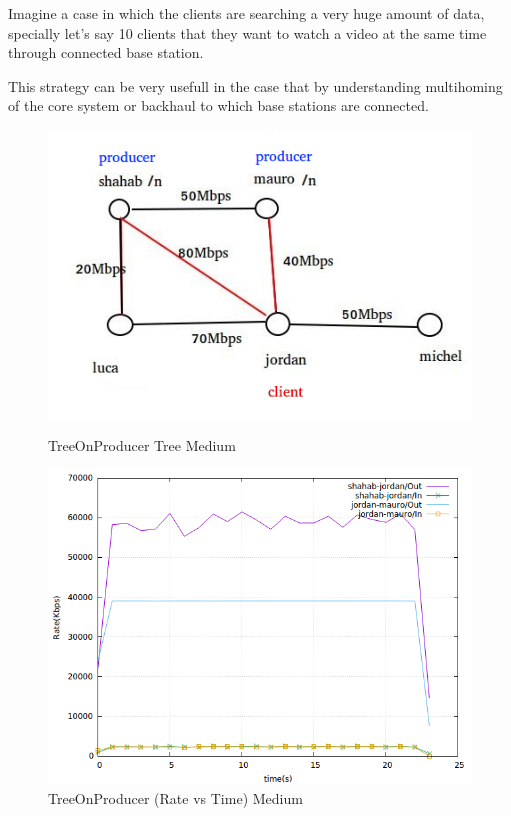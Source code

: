 Imagine a case in which the clients are searching a very huge amount of data, specially let's say 10 clients that they want to watch a video at the same time through connected base station.

This strategy can be very usefull in the case that by understanding multihoming of the core system or backhaul to which base stations are connected.

\begin{figure}[H]

\begin{center}

\includegraphics[scale = 0.4]{Figures/TreeOnProducer.png}

\caption{TreeOnProducer Tree Medium} \label{TreeOnProducer} 


\includegraphics[scale = 0.4]{Figures/treeonproducer.png}

\caption{TreeOnProducer (Rate vs Time) Medium} \label{treeonproducer} 


\end{center}

\end{figure}

